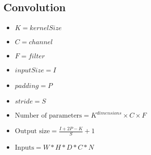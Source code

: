 \subsection*{Convolution}
\begin{itemize}
    \item $K = kernelSize$
    \item $C = channel$
    \item $F = filter$    \item $inputSize = I$
    \item $padding = P$
    \item $stride = S$
\end{itemize}


\begin{itemize}
    \item $\text{Number of parameters} = K^{dimensions} \times C \times F$
    \item $\text{Output size} = \frac{I + 2P - K}{S} + 1$
    \item $\text{Inputs} = W * H * D * C * N$
\end{itemize}

